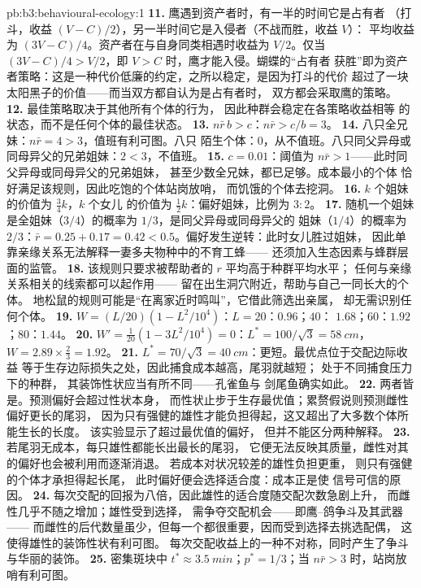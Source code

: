 \begin{solution}{pb:b3:behavioural-ecology:1}
\textbf{11.} 鹰遇到资产者时，有一半的时间它是占有者
（打斗，收益 $(V - C)/2$），另一半时间它是入侵者（不战而胜，收益 $V$）：
平均收益为 $(3V - C)/4$。资产者在与自身同类相遇时收益为 $V/2$。仅当
$(3V - C)/4 > V/2$，即 $V > C$ 时，鹰才能入侵。蝴蝶的“占有者
获胜”即为资产者策略：这是一种代价低廉的约定，之所以稳定，是因为打斗的代价
超过了一块太阳黑子的价值——而当双方都自认为是占有者时，
双方都会采取鹰的策略。
\textbf{12.} 最佳策略取决于其他所有个体的行为，
因此种群会稳定在各策略收益相等
的状态，而不是任何个体的最佳状态。
\textbf{13.} $n\bar r\,b > c$：$n\bar r > c/b = 3$。
\textbf{14.} 八只全兄妹：$n\bar r = 4 > 3$，值班有利可图。八只
陌生个体：$0$，从不值班。八只同父异母或同母异父的兄弟姐妹：$2 < 3$，不值班。
\textbf{15.} $c = 0.01$：阈值为 $n\bar r > 1$——此时同父异母或同母异父的兄弟姐妹，
甚至少数全兄妹，都已足够。成本最小的个体
恰好满足该规则，因此吃饱的个体站岗放哨，
而饥饿的个体去挖洞。
\textbf{16.} $k$ 个姐妹的价值为 $\tfrac{3}{4}k$，$k$ 个女儿
的价值为 $\tfrac{1}{2}k$：偏好姐妹，比例为 $3{:}2$。
\textbf{17.} 随机一个姐妹是全姐妹（$3/4$）的概率为 $1/3$，是同父异母或同母异父的
姐妹（$1/4$）的概率为 $2/3$：$\bar r = 0.25 +
0.17 = 0.42 < 0.5$。偏好发生逆转：此时女儿胜过姐妹，
因此单靠亲缘关系无法解释一妻多夫物种中的不育工蜂——
还须加入生态因素与蜂群层面的监管。
\textbf{18.} 该规则只要求被帮助者的 $r$ 平均高于种群平均水平；
任何与亲缘关系相关的线索都可以起作用——
留在出生洞穴附近，帮助与自己一同长大的个体。
地松鼠的规则可能是“在离家近时鸣叫”，它借此筛选出亲属，
却无需识别任何个体。
\textbf{19.} $W = (L/20)(1 - L^{2}/10^{4})$：$L = 20$：$0.96$；$40$：
$1.68$；$60$：$1.92$；$80$：$1.44$。
\textbf{20.} $W' = \tfrac{1}{20}(1 - 3L^{2}/10^{4}) = 0$：$L^{*} = 100/\sqrt{3}
= \qty{58}{cm}$，$W = 2.89\times\tfrac{2}{3} = 1.92$。
\textbf{21.} $L^{*} = 70/\sqrt{3} = \qty{40}{cm}$：更短。最优点位于交配边际收益
等于生存边际损失之处，因此捕食成本越高，尾羽就越短；
处于不同捕食压力下的种群，
其装饰性状应当有所不同——孔雀鱼与
剑尾鱼确实如此。
\textbf{22.} 两者皆是。预测偏好会超过性状本身，
而性状止步于生存最优值；累赘假说则预测雌性偏好更长的尾羽，
因为只有强健的雄性才能负担得起，这又超出了大多数个体所能生长的长度。
该实验显示了超过最优值的偏好，
但并不能区分两种解释。
\textbf{23.} 若尾羽无成本，每只雄性都能长出最长的尾羽，
它便无法反映其质量，雌性对其的偏好也会被利用而逐渐消退。
若成本对状况较差的雄性负担更重，
则只有强健的个体才承担得起长尾，
此时偏好便会选择适合度：成本正是使
信号可信的原因。
\textbf{24.} 每次交配的回报为八倍，因此雄性的适合度随交配次数急剧上升，
而雌性几乎不随之增加；雄性受到选择，
需争夺交配机会——即鹰–鸽争斗及其武器——
而雌性的后代数量虽少，但每一个都很重要，因而受到选择去挑选配偶，
这使得雄性的装饰性状有利可图。
每次交配收益上的一种不对称，同时产生了争斗与华丽的装饰。
\textbf{25.} 密集斑块中 $t^{*} \approx \qty{3.5}{min}$；$p^{*}
= 1/3$；当 $n\bar r > 3$ 时，站岗放哨有利可图。
\end{solution}
